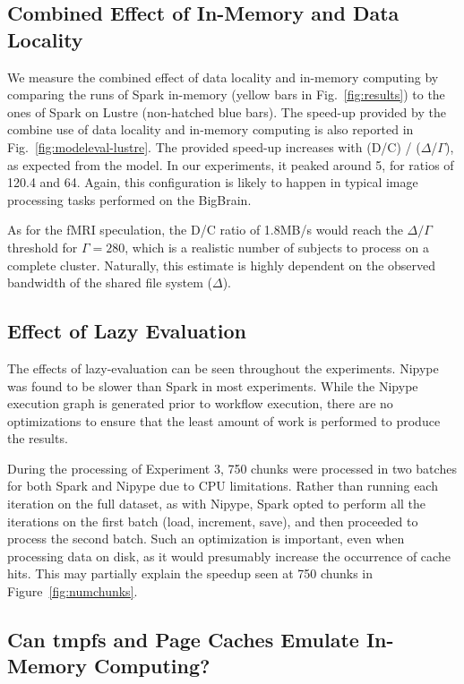 \documentclass{IEEEtran}
\begin{document}
\subsection{Combined Effect of In-Memory and Data Locality}
We measure the combined effect of data locality and in-memory computing 
by comparing the runs of Spark in-memory (yellow bars in 
Fig.~\ref{fig:results}) to the ones of Spark on Lustre (non-hatched 
blue bars). The speed-up provided by the combine use of data locality 
and in-memory computing is also reported in 
Fig.~\ref{fig:modeleval-lustre}. The provided speed-up increases with 
(D/C) / ($\Delta$/$\Gamma$), as expected from the model. In our 
experiments, it peaked around 5, for ratios of 120.4 and 64. Again, 
this configuration is likely to happen in typical image processing 
tasks performed on the BigBrain.

As for the fMRI speculation, the D/C 
ratio of 1.8MB/s would reach the $\Delta/\Gamma$ threshold for 
$\Gamma=280$, which is a realistic number of subjects to process on a 
complete cluster. Naturally, this estimate is highly dependent on the observed bandwidth
of the shared file system ($\Delta$).

\subsection{Effect of Lazy Evaluation}

The effects of lazy-evaluation can be seen throughout the experiments. Nipype 
was found to be slower than Spark in most experiments. While the Nipype execution
graph is 
generated prior to workflow execution, there are no optimizations
to ensure that the least amount of work is performed to produce the 
results. 

During the processing of Experiment 3, 750 chunks were processed in two batches
for both Spark and Nipype due to CPU limitations.
Rather than running each iteration on the full dataset, as with Nipype, 
Spark opted to perform all the iterations on the first batch (load, increment, save),
and then proceeded to process the second batch. Such an optimization is important, 
even when processing data on disk, as it would presumably increase the occurrence
of cache hits. This may partially explain the speedup seen at 750 chunks in
Figure~\ref{fig:numchunks}.%

\subsection{Can tmpfs and Page Caches Emulate In-Memory Computing?}
\end{document}
